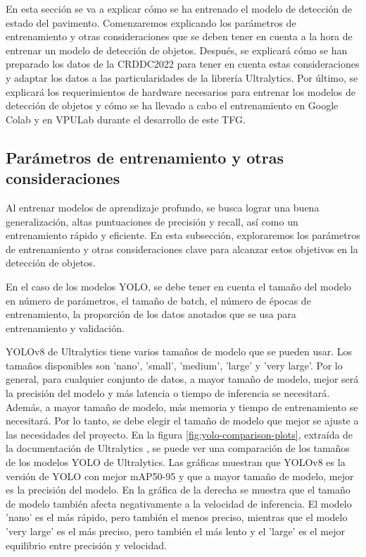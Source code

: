 En esta sección se va a explicar cómo se ha entrenado el modelo de detección de estado del pavimento. Comenzaremos explicando los parámetros de entrenamiento y otras consideraciones que se deben tener en cuenta a la hora de entrenar un modelo de detección de objetos. Después, se explicará cómo se han preparado los datos de la CRDDC2022 para tener en cuenta estas consideraciones y adaptar los datos a las particularidades de la librería Ultralytics. Por último, se explicará los requerimientos de hardware necesarios para entrenar los modelos de detección de objetos y cómo se ha llevado a cabo el entrenamiento en Google Colab y en VPULab durante el desarrollo de este TFG.

\subsection{Parámetros de entrenamiento y otras consideraciones}
Al entrenar modelos de aprendizaje profundo, se busca lograr una buena generalización, altas puntuaciones de precisión y recall, así como un entrenamiento rápido y eficiente. En esta subsección, exploraremos los parámetros de entrenamiento y otras consideraciones clave para alcanzar estos objetivos en la detección de objetos.

En el caso de los modelos YOLO, se debe tener en cuenta el tamaño del modelo en número de parámetros, el tamaño de batch, el número de épocas de entrenamiento, la proporción de los datos anotados que se usa para entrenamiento y validación.

YOLOv8 de Ultralytics tiene varios tamaños de modelo que se pueden usar. Los tamaños disponibles son 'nano', 'small', 'medium', 'large' y 'very large'. Por lo general, para cualquier conjunto de datos, a mayor tamaño de modelo, mejor será la precisión del modelo y más latencia o tiempo de inferencia se necesitará. Además, a mayor tamaño de modelo, más memoria y tiempo de entrenamiento se necesitará. Por lo tanto, se debe elegir el tamaño de modelo que mejor se ajuste a las necesidades del proyecto. En la figura \ref{fig:yolo-comparison-plots}, extraída de la documentación de Ultralytics \cite{yolov8_ultralytics}, se puede ver una comparación de los tamaños de los modelos YOLO de Ultralytics. Las gráficas muestran que YOLOv8 es la versión de YOLO con mejor mAP50-95 y que a mayor tamaño de modelo, mejor es la precisión del modelo. En la gráfica de la derecha se muestra que el tamaño de modelo también afecta negativamente a la velocidad de inferencia. El modelo 'nano' es el más rápido, pero también el menos preciso, mientras que el modelo 'very large' es el más preciso, pero también el más lento y el 'large' es el mejor equilibrio entre precisión y velocidad.

